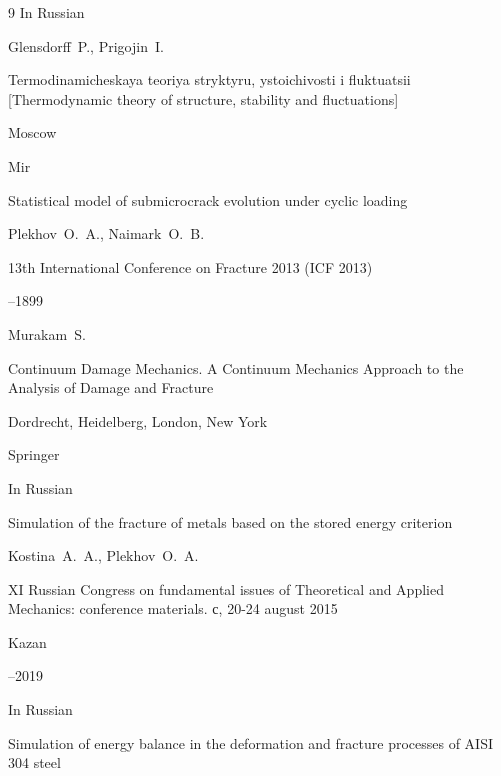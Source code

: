 \begin{thebibliography}{9}
\lang In Russian

\by Glensdorff~P., Prigojin~I.

\book Termodinamicheskaya teoriya stryktyru, ystoichivosti i fluktuatsii [Thermodynamic theory of structure, stability and fluctuations]

\publaddr Moscow

\publ Mir






\paper Statistical model of submicrocrack evolution under cyclic loading

\by Plekhov~O.~A., Naimark~O.~B.

\jour 13th International Conference on Fracture 2013 (ICF 2013)


--1899




\by Murakam~S.

\book  Continuum Damage Mechanics. A Continuum Mechanics Approach to the Analysis of Damage and Fracture

\publaddr Dordrecht, Heidelberg, London, New York

\publ Springer






\lang In Russian

\paper Simulation of the fracture of metals based on the stored energy criterion

\by Kostina~A.~A., Plekhov~O.~A.

\inbook XI Russian Congress on fundamental issues of Theoretical and Applied Mechanics: conference materials. с, 20-24 august 2015

\publaddr Kazan


--2019




\lang In Russian

\paper Simulation of energy balance in the deformation and fracture processes of AISI 304 steel


\end{thebibliography}
